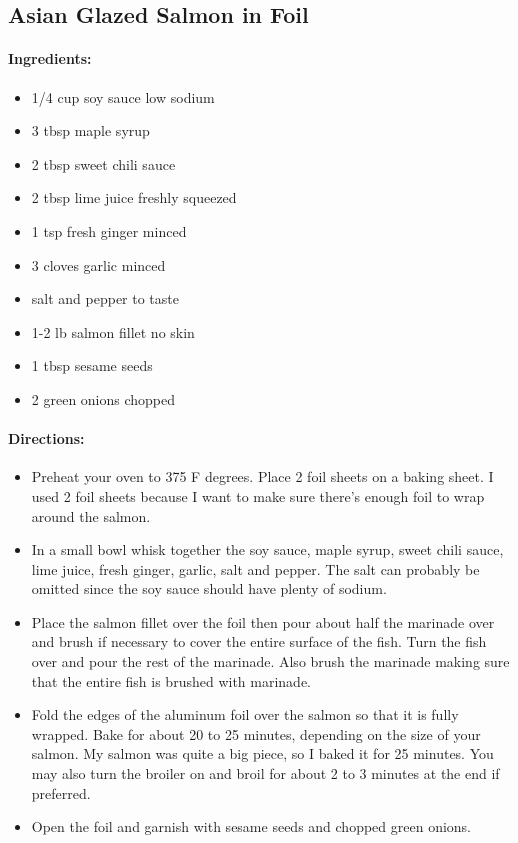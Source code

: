 \documentclass{article}
\begin{document}
\subsection{Asian Glazed Salmon in Foil}

\paragraph{Ingredients:}
\begin{itemize}
  \item 1/4 cup soy sauce low sodium
  \item 3 tbsp maple syrup
  \item 2 tbsp sweet chili sauce
  \item 2 tbsp lime juice freshly squeezed
  \item 1 tsp fresh ginger minced
  \item 3 cloves garlic minced
  \item salt and pepper to taste
  \item 1-2 lb salmon fillet no skin
  \item 1 tbsp sesame seeds
  \item 2 green onions chopped
\end{itemize}

\paragraph{Directions:}
\begin{itemize}
  \item Preheat your oven to 375 F degrees. Place 2 foil sheets on a baking sheet. I used 2 foil sheets because I
want to make sure there’s enough foil to wrap around the salmon.
  \item In a small bowl whisk together the soy sauce, maple syrup, sweet chili sauce, lime juice, fresh ginger,
garlic, salt and pepper. The salt can probably be omitted since the soy sauce should have plenty of
sodium.
  \item Place the salmon fillet over the foil then pour about half the marinade over and brush if necessary to
cover the entire surface of the fish. Turn the fish over and pour the rest of the marinade. Also brush the
marinade making sure that the entire fish is brushed with marinade.
  \item Fold the edges of the aluminum foil over the salmon so that it is fully wrapped. Bake for about 20 to
25 minutes, depending on the size of your salmon. My salmon was quite a big piece, so I baked it for 25
minutes. You may also turn the broiler on and broil for about 2 to 3 minutes at the end if preferred.
  \item Open the foil and garnish with sesame seeds and chopped green onions.
\end{itemize}
\end{document}
